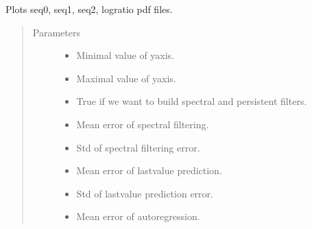 \documentclass[letterpaper,10pt,english]{sphinxmanual}
\begin{document}
\begin{fulllineitems}
\label{\detokenize{LDS:LDS.OnlineLDS_library.plot_p3}}
\sphinxAtStartPar
Plots seq0, seq1, seq2, logratio pdf files.
\begin{quote}\begin{description}
\item[{Parameters}] \leavevmode\begin{itemize}
\item {} 
\sphinxAtStartPar
{} \textendash{} Minimal value of y\sphinxhyphen{}axis.

\item {} 
\sphinxAtStartPar
{} \textendash{} Maximal value of y\sphinxhyphen{}axis.

\item {} 
\sphinxAtStartPar
{} \textendash{} True if we want to build spectral and persistent filters.

\item {} 
\sphinxAtStartPar
{} \textendash{} Mean error of spectral filtering.

\item {} 
\sphinxAtStartPar
{} \textendash{} Std of spectral filtering error.

\item {} 
\sphinxAtStartPar
{} \textendash{} Mean error of last\sphinxhyphen{}value prediction.

\item {} 
\sphinxAtStartPar
{} \textendash{} Std of last\sphinxhyphen{}value prediction error.

\item {} 
\sphinxAtStartPar
{} \textendash{} Mean error of auto\sphinxhyphen{}regression.


\end{itemize}
\end{description}
\end{quote}
\end{fulllineitems}
\end{document}
